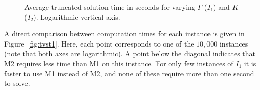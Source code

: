 \begin{figure}[htb]
\begin{center}
%
\hfill
{}
\end{center}
\caption{Average truncated solution time in seconds for varying $\Gamma$ ($I_1$) and $K$ ($I_2$). Logarithmic vertical axis.\label{fig:time}}
\end{figure}	

A direct comparison between computation times for each instance is given in Figure~\ref{fig:tvst1}. Here, each point corresponds to one of the $10,000$ instances (note that both axes are logarithmic). A point below the diagonal indicates that M2 requires less time than M1 on this instance. For only few instances of $I_1$ it is faster to use M1 instead of M2, and none of these require more than one second to solve.

